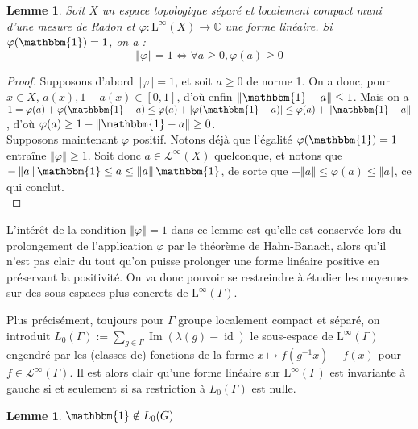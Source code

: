 \documentclass[a4paper,12pt]{article}
\newtheorem{lemma}[theorem]{Lemme}
\newcommand{\C}{\mathbb{C}}
\newcommand{\norm}[1]{\left\Vert #1\right\Vert}
\newcommand{\abs}[1]{\left\vert#1\right\vert}
\newcommand{\indic}{\mathbbm{1}}
\newcommand{\ssi}{si et seulement si }
\newcommand{\inv}{^{-1}}
\renewcommand{\iff}{\Leftrightarrow}
\DeclareMathOperator{\id}{id}
\DeclareMathOperator{\Ima}{Im}
\begin{document}
\begin{lemma}
    Soit $X$ un espace topologique séparé et localement compact muni d'une mesure de Radon et $\varphi:\mathrm{L}^\infty(X)\to\C$ une forme linéaire. 
    Si $\varphi(\indic) = 1$, on a :
    \begin{equation*}
        \norm{\varphi} = 1 \iff \forall a \ge 0, \varphi(a) \geq 0
    \end{equation*}
\end{lemma}

\begin{proof}
    Supposons d'abord $\norm{\varphi} = 1$, et soit $a\ge 0$ de norme 1. On a donc, pour $x\in X$, $a(x), 1-a(x)\in[0,1]$,
    d'où enfin $\norm{\indic-a}\le 1$. Mais on a $1 = \varphi(a) + \varphi(\indic-a) \le \varphi(a) + \abs{\varphi(\indic-a)} \le \varphi(a) + \norm{\indic - a}$, d'où
    $\varphi(a)\ge 1 - \norm{\indic-a}\ge0$. \\
    Supposons maintenant $\varphi$ positif. Notons déjà que l'égalité $\varphi(\indic) = 1$ entraîne $\norm{\varphi}\ge1$. Soit donc $a\in\mathscr{L}^\infty(X)$ quelconque,
    et notons que $-\norm{a}\indic\le a\le\norm{a}\indic$, de sorte que $-\norm{a}\le\varphi(a)\le\norm{a}$, ce qui conclut. \\
\end{proof}

L'intérêt de la condition $\norm\varphi = 1$ dans ce lemme est qu'elle est conservée lors du prolongement de l'application $\varphi$ par le théorème
de Hahn-Banach, alors qu'il n'est pas clair du tout qu'on puisse prolonger une forme linéaire positive en préservant la positivité. On va donc pouvoir se restreindre
à étudier les moyennes sur des sous-espaces plus concrets de $\mathrm{L}^\infty(\Gamma)$.

Plus précisément, toujours pour $\Gamma$ groupe localement compact et séparé, on introduit $L_0(\Gamma) := \sum_{g\in\Gamma} \Ima(\lambda(g) - \id)$ le sous-espace de 
$\mathrm{L}^\infty(\Gamma)$ engendré par les (classes de) fonctions de la forme $x\mapsto f(g\inv x) - f(x)$ pour $f\in\mathscr{L}^\infty(\Gamma)$. 
Il est alors clair qu'une forme linéaire sur $\mathrm{L}^\infty(\Gamma)$ est invariante à gauche \ssi sa restriction à $L_0(\Gamma)$ est nulle. 

\begin{lemma}
    $\indic\notin L_0(G)$
\end{lemma}
\end{document}
